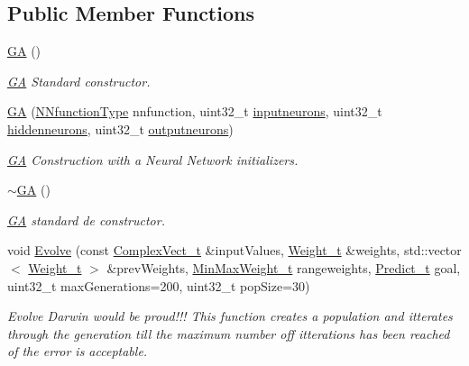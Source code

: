 \subsection*{Public Member Functions}
\begin{DoxyCompactItemize}
\item 
\hyperlink{class_soil_math_1_1_g_a_a759b77fbe44fa1d5df5bcbdee9d97c4e}{G\+A} ()
\begin{DoxyCompactList}\small\item\em \hyperlink{class_soil_math_1_1_g_a}{G\+A} Standard constructor. \end{DoxyCompactList}\item 
\hyperlink{class_soil_math_1_1_g_a_a6fed498b99290a5218cc3ecd9537fc74}{G\+A} (\hyperlink{_soil_math_types_8h_a7791f1b8f92a964847637c5d657c1b10}{N\+Nfunction\+Type} nnfunction, uint32\+\_\+t \hyperlink{class_soil_math_1_1_g_a_ac32591e30dde5ac854ae57a7b9e33298}{inputneurons}, uint32\+\_\+t \hyperlink{class_soil_math_1_1_g_a_a3f1eee7492f68a05b9b06ee8afb2ec20}{hiddenneurons}, uint32\+\_\+t \hyperlink{class_soil_math_1_1_g_a_ab454f9968d5ce2a294b89f85c9d3a74f}{outputneurons})
\begin{DoxyCompactList}\small\item\em \hyperlink{class_soil_math_1_1_g_a}{G\+A} Construction with a Neural Network initializers. \end{DoxyCompactList}\item 
\hyperlink{class_soil_math_1_1_g_a_a7a7087b2c5a268a1a9bccc04600537f6}{$\sim$\+G\+A} ()
\begin{DoxyCompactList}\small\item\em \hyperlink{class_soil_math_1_1_g_a}{G\+A} standard de constructor. \end{DoxyCompactList}\item 
void \hyperlink{class_soil_math_1_1_g_a_a4290310d89064946c645673840591540}{Evolve} (const \hyperlink{_soil_math_types_8h_a7567e521c2b2c408dcb62dbff72390f7}{Complex\+Vect\+\_\+t} \&input\+Values, \hyperlink{_soil_math_types_8h_ac56ad2b88186620fd0de0d213aa715dd}{Weight\+\_\+t} \&weights, std\+::vector$<$ \hyperlink{_soil_math_types_8h_ac56ad2b88186620fd0de0d213aa715dd}{Weight\+\_\+t} $>$ \&prev\+Weights, \hyperlink{_soil_math_types_8h_aaa919636507bcd52b19efa301aa80b9a}{Min\+Max\+Weight\+\_\+t} rangeweights, \hyperlink{_soil_math_types_8h_aaeba766195a440b2539f0438d3d41f95}{Predict\+\_\+t} goal, uint32\+\_\+t max\+Generations=200, uint32\+\_\+t pop\+Size=30)
\begin{DoxyCompactList}\small\item\em Evolve Darwin would be proud!!! This function creates a population and itterates through the generation till the maximum number off itterations has been reached of the error is acceptable. \end{DoxyCompactList}\item 

\end{DoxyCompactItemize}
